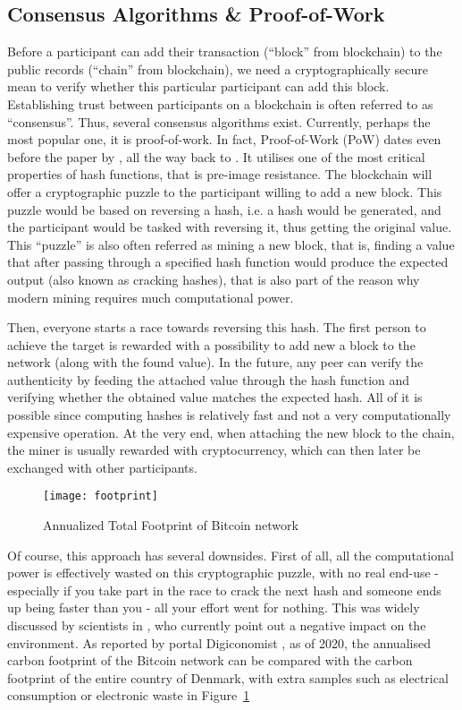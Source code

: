 \subsection{Consensus Algorithms \& Proof-of-Work}\label{sec:pow}
Before a participant can add their transaction (``block'' from blockchain) to the public records (``chain'' from blockchain), we need a cryptographically secure mean to verify whether this particular participant can add this block. Establishing trust between participants on a blockchain is often referred to as ``consensus''. Thus, several consensus algorithms exist. Currently, perhaps the most popular one, it is proof-of-work. In fact, Proof-of-Work (PoW) dates even before the paper by \citet{nakamoto2008peer}, all the way back to \citet{jakobsson1999proofs}. It utilises one of the most critical properties of hash functions, that is pre-image resistance. The blockchain will offer a cryptographic puzzle to the participant willing to add a new block. This puzzle would be based on reversing a hash, i.e. a hash would be generated, and the participant would be tasked with reversing it, thus getting the original value. This ``puzzle'' is also often referred as mining a new block, that is, finding a value that after passing through a specified hash function would produce the expected output (also known as cracking hashes), that is also part of the reason why modern mining requires much computational power. 

Then, everyone starts a race towards reversing this hash. The first person to achieve the target is rewarded with a possibility to add new a block to the network (along with the found value). In the future, any peer can verify the authenticity by feeding the attached value through the hash function and verifying whether the obtained value matches the expected hash. All of it is possible since computing hashes is relatively fast and not a very computationally expensive operation. At the very end, when attaching the new block to the chain, the miner is usually rewarded with cryptocurrency, which can then later be exchanged with other participants.

\begin{figure}[ht]
    \centering
    \texttt{[image: footprint]}
    \caption{Annualized Total Footprint of Bitcoin network \cite{index2017digiconomist}}
    \label{fig:footprint}
\end{figure}

Of course, this approach has several downsides. First of all, all the computational power is effectively wasted on this cryptographic puzzle, with no real end-use - especially if you take part in the race to crack the next hash and someone ends up being faster than you - all your effort went for nothing. This was widely discussed by scientists in \citet{gervais2016security}, who currently point out a negative impact on the environment. As reported by portal Digiconomist \cite{index2017digiconomist}, as of 2020, the annualised carbon footprint of the Bitcoin network can be compared with the carbon footprint of the entire country of Denmark, with extra samples such as electrical consumption or electronic waste in Figure~\ref{fig:footprint}

